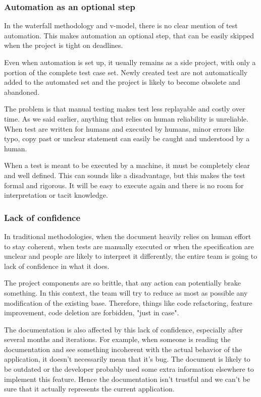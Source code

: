 \subsubsection{Automation as an optional step}
In the waterfall methodology and v-model, there is no clear mention of test
automation.
This makes automation an optional step, that can be easily skipped when the
project is tight on deadlines.

Even when automation is set up, it usually remains as a side project, with
only a portion of the complete test case set.
Newly created test are not automatically added to the automated set and the
project is likely to become obsolete and abandoned.

The problem is that manual testing makes test less replayable and costly over
time.
As we said earlier, anything that relies on human reliability is unreliable.
When test are written for humans and executed by humans, minor errors like
typo, copy past or unclear statement can easily be caught and
understood by a human.

When a test is meant to be executed by a machine, it must be completely clear
and well defined.
This can sounds like a disadvantage, but this makes the test formal and
rigorous.
It will be easy to execute again and there is no room for interpretation or
tacit knowledge.

\subsubsection{Lack of confidence}
In traditional methodologies, when the document heavily relies on human
effort to stay coherent, when tests are manually executed or when the
specification are unclear and people are likely to interpret it differently,
the entire team is going to lack of confidence in what it does.

The project components are so brittle, that any action can potentially brake
something.
In this context, the team will try to reduce as most as possible any
modification of the existing base.
Therefore, things like code refactoring, feature improvement, code deletion
are forbidden, "just in case".

The documentation is also affected by this lack of confidence, especially after
several months and iterations.
For example, when someone is reading the documentation and see something
incoherent with the actual behavior of the application, it doesn't
necessarily mean that it's bug.
The document is likely to be outdated or the developer probably used some
extra information elsewhere to implement this feature.
Hence the documentation isn't trustful and we can't be sure that it actually
represents the current application.

